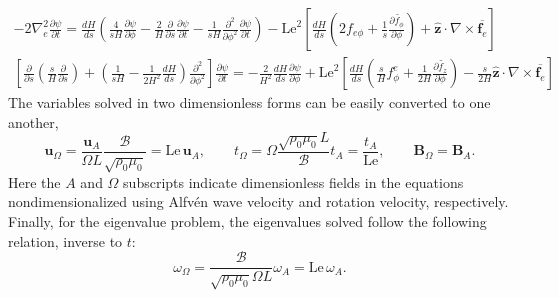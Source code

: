 \[\begin{gathered}
    -2\nabla_e^2 \frac{\partial \psi}{\partial t} = \frac{dH}{ds} \left(\frac{4}{sH}\frac{\partial \psi}{\partial \phi} - \frac{2}{H}\frac{\partial}{\partial s}\frac{\partial \psi}{\partial t} - \frac{1}{sH}\frac{\partial^2}{\partial \phi^2}\frac{\partial \psi}{\partial t}\right) - \mathrm{Le}^2 \left[\frac{dH}{ds}\left(2f_{e\phi} + \frac{1}{s}\frac{\partial \widetilde{f_\phi}}{\partial \phi}\right) + \hat{\mathbf{z}}\cdot \nabla\times \overline{\mathbf{f}_e}\right] \\ 
    \left[\frac{\partial}{\partial s}\left(\frac{s}{H}\frac{\partial}{\partial s}\right) + \left(\frac{1}{sH} - \frac{1}{2H^2} \frac{dH}{ds}\right)\frac{\partial^2}{\partial \phi^2}\right] \frac{\partial \psi}{\partial t} = - \frac{2}{H^2}\frac{dH}{ds} \frac{\partial \psi}{\partial \phi} + \mathrm{Le}^2 \left[\frac{dH}{ds} \left(\frac{s}{H} f_\phi^e + \frac{1}{2H}\frac{\partial \widetilde{f_z}}{\partial \phi}\right) - \frac{s}{2H}\hat{\mathbf{z}}\cdot \nabla\times \overline{\mathbf{f}_e}\right]
\end{gathered}
\]
The variables solved in two dimensionless forms can be easily converted to one another,
\[
    \mathbf{u}_\Omega = \frac{\mathbf{u}_A}{\Omega L} \frac{\mathscr{B}}{\sqrt{\rho_0 \mu_0}} = \mathrm{Le} \, \mathbf{u}_A, \qquad t_\Omega = \Omega \frac{\sqrt{\rho_0 \mu_0} L}{\mathscr{B}} t_A = \frac{t_A}{\mathrm{Le}},\qquad \mathbf{B}_\Omega = \mathbf{B}_A.
\]
Here the $A$ and $\Omega$ subscripts indicate dimensionless fields in the equations nondimensionalized using Alfvén wave velocity and rotation velocity, respectively. Finally, for the eigenvalue problem, the eigenvalues solved follow the following relation, inverse to $t$:
\[
    \omega_\Omega = \frac{\mathscr{B}}{\sqrt{\rho_0 \mu_0} \Omega L} \omega_A = \mathrm{Le} \, \omega_A.
\]
